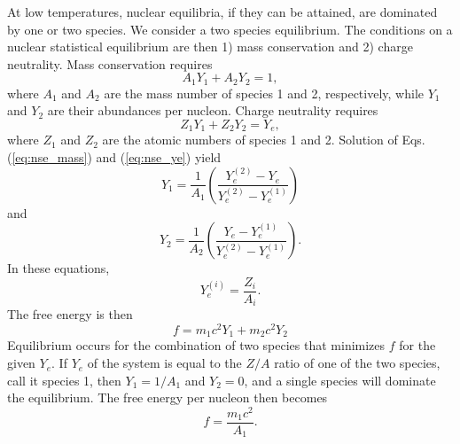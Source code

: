 \documentclass{article}    %
\begin{document}
At low temperatures, nuclear equilibria, if they can be attained, are
dominated by one or two species.  We consider a two species equilibrium.
The conditions on a nuclear statistical equilibrium are then 1) mass
conservation and 2) charge neutrality.  Mass conservation requires
\begin{equation}
A_1 Y_1 + A_2 Y_2 = 1,
\label{eq:nse_mass}
\end{equation}
where $A_1$ and $A_2$ are the mass number of species 1 and 2, respectively,
while $Y_1$ and $Y_2$ are their abundances per nucleon.  Charge
neutrality requires
\begin{equation}
Z_1 Y_1 + Z_2 Y_2 = Y_e,
\label{eq:nse_ye}
\end{equation}
where $Z_1$ and $Z_2$ are the atomic numbers of species 1 and 2.  Solution
of Eqs. (\ref{eq:nse_mass}) and (\ref{eq:nse_ye}) yield
\begin{equation}
Y_1 = \frac{1}{A_1}\left(\frac{Y_e^{(2)} - Y_e}{Y_e^{(2)} - Y_e^{(1)}}\right)
\label{eq:y1}
\end{equation}
and
\begin{equation}
Y_2 = \frac{1}{A_2}\left(\frac{Y_e - Y_e^{(1)}}{Y_e^{(2)} - Y_e^{(1)}}\right).
\label{eq:y2}
\end{equation}
In these equations,
\begin{equation}
Y_e^{(i)} = \frac{Z_i}{A_i}.
\label{eq:yei}
\end{equation}
The free energy is then
\begin{equation}
f = m_1c^2 Y_1 + m_2c^2 Y_2
\label{eq:f_2species}
\end{equation}
Equilibrium occurs for the combination of two species that minimizes $f$ for
the given $Y_e$.
If $Y_e$ of the system is equal to the $Z/A$ ratio of one of the two species,
call it species 1, then $Y_1 = 1/A_1$ and $Y_2 = 0$, and a single species
will dominate the equilibrium.  The free energy per nucleon then becomes
\begin{equation}
f = \frac{m_1c^2}{A_1}.
\label{eq:f_1species}
\end{equation}
\end{document}
